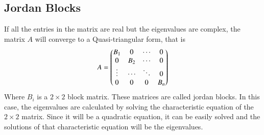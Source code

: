 \documentclass[a4paper,12pt]{article}
\theoremstyle{remark}
\begin{document}
\subsection{Jordan Blocks}
If all the entries in the matrix are real but the eigenvalues are complex, the matrix $A$ will converge to a Quasi-triangular form, that is
\begin{align}
	A = \begin{pmatrix}B_1 & 0 & \cdots & 0 \\
		   0 & B_2 & \cdots & 0\\
		   \vdots & \cdots & \ddots & 0\\
		   0 & 0 & 0 & B_n\end{pmatrix}
\end{align}
Where $B_i$ is a $2 \times 2$ block matrix. These matrices are called jordan blocks. In this case, the eigenvalues are calculated by solving the characteristic equation of the $2 \times 2$ matrix. Since it will be a quadratic equation, it can be easily solved and the solutions of that characteristic equation will be the eigenvalues. 
\end{document}
